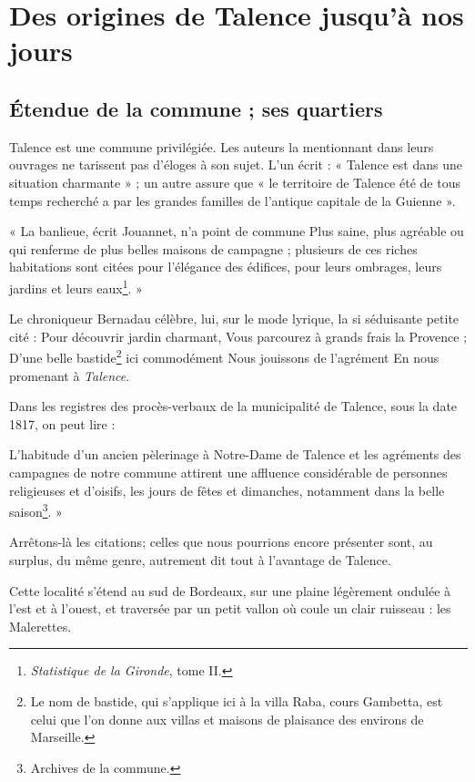 \section{Des origines de Talence jusqu'à nos jours}

\subsection{Étendue de la commune ; ses quartiers}

Talence est une commune privilégiée. Les auteurs la mentionnant dans leurs ouvrages ne tarissent pas d'éloges à son sujet. L'un écrit : « Talence est dans une situation charmante » ; un autre assure que « le territoire de Talence été de tous temps recherché a par les grandes familles de l'antique capitale de la Guienne ».

« La banlieue, écrit Jouannet, n'a point de commune Plus saine, plus agréable ou qui renferme de plus belles maisons de campagne ; plusieurs de ces riches habitations sont citées pour l'élégance des édifices, pour leurs ombrages, leurs jardins et leurs eaux\footnote{\textit{Statistique de la Gironde}, tome II.}. »

Le chroniqueur Bernadau célèbre, lui, sur le mode lyrique, la si séduisante petite cité : 
Pour découvrir jardin charmant, 
Vous parcourez à grands frais la Provence ; 
D'une belle bastide\footnote{Le nom de bastide, qui s'applique ici à la villa Raba, cours Gambetta, est celui que l'on donne aux villas et maisons de plaisance des environs de Marseille.} ici commodément 
Nous jouissons de l'agrément 
En nous promenant à \textit{Talence}. 

Dans les registres des procès-verbaux de la municipalité de Talence, sous la date 1817, on peut lire : 

L'habitude d'un ancien pèlerinage à Notre-Dame de Talence et les agréments des campagnes de notre commune attirent une affluence considérable de personnes religieuses et d'oisifs, les jours de fêtes et dimanches, notamment dans la belle saison\footnote{Archives de la commune.}. »

Arrêtons-là les citations; celles que nous pourrions encore présenter sont, au surplus, du même genre, autrement dit tout à l'avantage de Talence. 

Cette localité s'étend au sud de Bordeaux, sur une plaine légèrement ondulée à l'est et à l'ouest, et traversée par un petit vallon où coule un clair ruisseau : les Malerettes. 

